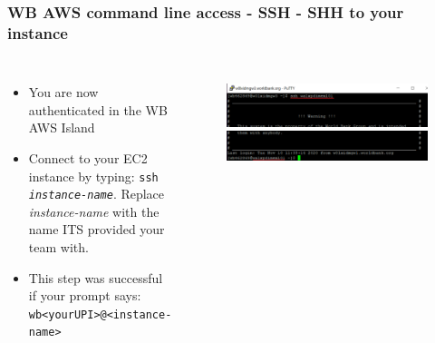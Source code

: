\documentclass[aspectratio=169]{beamer} %
\begin{document}
\begin{frame}
	\frametitle{WB AWS command line access - SSH - SHH to your instance}
	\begin{columns}[c]
		\begin{itemize}
			\item You are now authenticated in the WB AWS Island
			\item Connect to your EC2 instance by typing: \newline
			\texttt{ssh \textit{instance-name}}. 
			Replace \textit{instance-name} with the name 
			ITS provided your team with.
			\item This step was successful if your prompt says:
			\texttt{wb<yourUPI>@<instance-name>}
		\end{itemize}

		\begin{figure}
			\centering
			\includegraphics[width=\textwidth]{./img/access-3a.png}
			\includegraphics[width=\textwidth]{./img/access-3b.png}
		\end{figure}

	\end{columns}
\end{frame}
\end{document}
